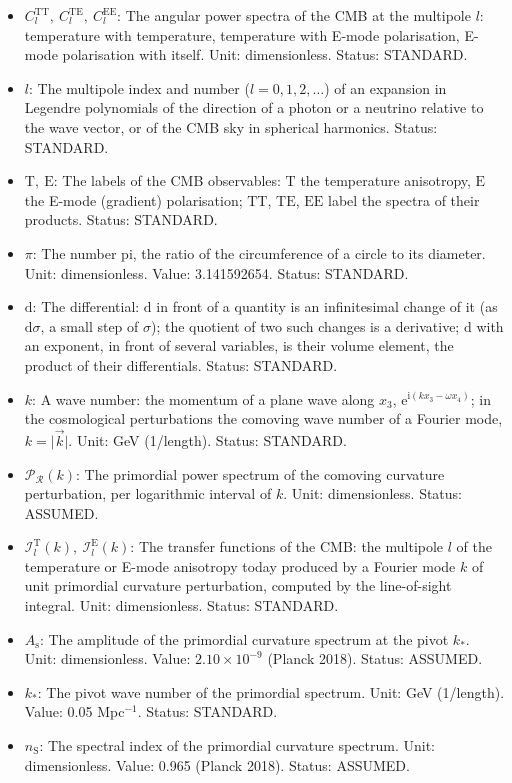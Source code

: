 \documentclass[
  10pt,
]{article}
\providecommand{\tightlist}{%
  \setlength{\itemsep}{0pt}\setlength{\parskip}{0pt}}
\begin{document}
\begin{itemize}
\tightlist
\item
  \(C_l^{\mathrm{TT}},\ C_l^{\mathrm{TE}},\ C_l^{\mathrm{EE}}\): The
  angular power spectra of the CMB at the multipole \(l\): temperature
  with temperature, temperature with E-mode polarisation, E-mode
  polarisation with itself. Unit: dimensionless. Status: STANDARD.
\item
  \(l\): The multipole index and number (\(l = 0, 1, 2, \dots\)) of an
  expansion in Legendre polynomials of the direction of a photon or a
  neutrino relative to the wave vector, or of the CMB sky in spherical
  harmonics. Status: STANDARD.
\item
  \(\mathrm{T},\ \mathrm{E}\): The labels of the CMB observables:
  \(\mathrm{T}\) the temperature anisotropy, \(\mathrm{E}\) the E-mode
  (gradient) polarisation; \(\mathrm{TT}\), \(\mathrm{TE}\),
  \(\mathrm{EE}\) label the spectra of their products. Status: STANDARD.
\item
  \(\pi\): The number pi, the ratio of the circumference of a circle to
  its diameter. Unit: dimensionless. Value: 3.141592654. Status:
  STANDARD.
\item
  \(\mathrm{d}\): The differential: \(\mathrm{d}\) in front of a
  quantity is an infinitesimal change of it (as \(\mathrm{d}\sigma\), a
  small step of \(\sigma\)); the quotient of two such changes is a
  derivative; \(\mathrm{d}\) with an exponent, in front of several
  variables, is their volume element, the product of their
  differentials. Status: STANDARD.
\item
  \(k\): A wave number: the momentum of a plane wave along \(x_3\),
  \(\mathrm{e}^{\mathrm{i}(kx_3 - \omega x_4)}\); in the cosmological
  perturbations the comoving wave number of a Fourier mode,
  \(k = \lvert\vec k\rvert\). Unit: GeV (1/length). Status: STANDARD.
\item
  \(\mathcal{P}_{\mathcal{R}}(k)\): The primordial power spectrum of the
  comoving curvature perturbation, per logarithmic interval of \(k\).
  Unit: dimensionless. Status: ASSUMED.
\item
  \(\mathcal{I}_l^{\mathrm{T}}(k),\ \mathcal{I}_l^{\mathrm{E}}(k)\): The
  transfer functions of the CMB: the multipole \(l\) of the temperature
  or E-mode anisotropy today produced by a Fourier mode \(k\) of unit
  primordial curvature perturbation, computed by the line-of-sight
  integral. Unit: dimensionless. Status: STANDARD.
\item
  \(A_{\mathrm{s}}\): The amplitude of the primordial curvature spectrum
  at the pivot \(k_*\). Unit: dimensionless. Value:
  \(2.10\times10^{-9}\) (Planck 2018). Status: ASSUMED.
\item
  \(k_*\): The pivot wave number of the primordial spectrum. Unit: GeV
  (1/length). Value: 0.05 Mpc\(^{-1}\). Status: STANDARD.
\item
  \(n_{\mathrm{S}}\): The spectral index of the primordial curvature
  spectrum. Unit: dimensionless. Value: 0.965 (Planck 2018). Status:
  ASSUMED.
\end{itemize}
\end{document}

